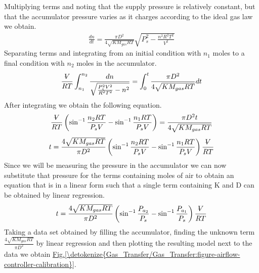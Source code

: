 \documentclass[letterpaper,10pt,english]{sphinxmanual}
\begin{document}
Multiplying terms and noting that the supply pressure is relatively constant, but that the accumulator pressure varies as it charges according to the ideal gas law we obtain.
\begin{equation}\label{equation:Gas_Transfer/Gas_Transfer:Gas_Transfer/Gas_Transfer:12}
\begin{split}\frac{dn}{dt} =\frac{\pi D^{2} }{4\sqrt{KM_{gas} RT} } \sqrt{P_{s}^{2} -\frac{n^{2} R^{2} T^{2} }{V^{2} } }\end{split}
\end{equation}
Separating terms and integrating from an initial condition with \(n_1\) moles to a final condition with \(n_2\) moles in the accumulator.
\begin{equation}\label{equation:Gas_Transfer/Gas_Transfer:Gas_Transfer/Gas_Transfer:13}
\begin{split}\frac{\rlap{--}V}{RT} \int _{n_{1} }^{n_{2} }\frac{dn}{\sqrt{\frac{P_{s}^{2} V^{2} }{R^{2} T^{2} } -n^{2} } }  =\int _{0}^{t}\frac{\pi D^{2} }{4\sqrt{KM_{gas} RT} } dt\end{split}
\end{equation}
After integrating we obtain the following equation.
\begin{equation}\label{equation:Gas_Transfer/Gas_Transfer:Gas_Transfer/Gas_Transfer:14}
\begin{split}\frac{\rlap{--}V}{RT} \left(\sin ^{-1} \frac{n_{2} RT}{P_{s} V} -\sin ^{-1} \frac{n_{1} RT}{P_{s} V} \right)=\frac{\pi D^{2} t}{4\sqrt{KM_{gas} RT} }\end{split}
\end{equation}\begin{equation}\label{equation:Gas_Transfer/Gas_Transfer:Gas_Transfer/Gas_Transfer:15}
\begin{split}t=\frac{4\sqrt{KM_{gas} RT} }{\pi D^{2} } \left(\sin ^{-1} \frac{n_{2} RT}{P_{s} V} -\sin ^{-1} \frac{n_{1} RT}{P_{s} V} \right)\frac{\rlap{--}V}{RT}\end{split}
\end{equation}
Since we will be measuring the pressure in the accumulator we can now substitute that pressure for the terms containing moles of air to obtain an equation that is in a linear form such that a single term containing K and D can be obtained by linear regression.
\begin{equation}\label{equation:Gas_Transfer/Gas_Transfer:Gas_Transfer/Gas_Transfer:16}
\begin{split}t=\frac{4\sqrt{KM_{gas} RT} }{\pi D^{2} } \left(\sin ^{-1} \frac{P_{a_{2} } }{P_{s} } -\sin ^{-1} \frac{P_{a_{1} } }{P_{s} } \right)\frac{\rlap{--}V}{RT}\end{split}
\end{equation}
Taking a data set obtained by filling the accumulator, finding the unknown term \(\frac{4\sqrt{KM_{gas} RT} }{\pi D^{2} }\) by linear regression and then plotting the resulting model next to the data we obtain \hyperref[\detokenize{Gas_Transfer/Gas_Transfer:figure-airflow-controller-calibration}]{Fig.\@ \ref{\detokenize{Gas_Transfer/Gas_Transfer:figure-airflow-controller-calibration}}}.
\end{document}
